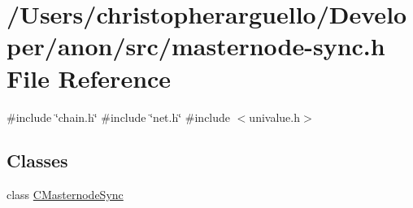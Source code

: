 \hypertarget{masternode-sync_8h}{}\section{/\+Users/christopherarguello/\+Developer/anon/src/masternode-\/sync.h File Reference}
\label{masternode-sync_8h}
{\ttfamily \#include \char`\"{}chain.\+h\char`\"{}}\newline
{\ttfamily \#include \char`\"{}net.\+h\char`\"{}}\newline
{\ttfamily \#include $<$univalue.\+h$>$}\newline
\subsection*{Classes}
\begin{DoxyCompactItemize}
\item 
class \mbox{\hyperlink{class_c_masternode_sync}{C\+Masternode\+Sync}}
\end{DoxyCompactItemize}
